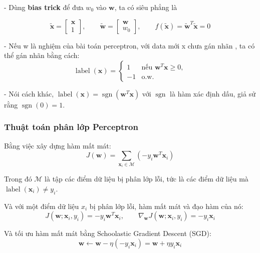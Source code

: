 - Dùng \textbf{bias trick} để đưa \(w_0\) vào \(\mathbf{w}\), ta có siêu phẳng là

\[
\tilde{\mathbf{x}} = \begin{bmatrix} \mathbf{x} \\ 1 \end{bmatrix}, \qquad
\tilde{\mathbf{w}} = \begin{bmatrix} \mathbf{w} \\ w_0 \end{bmatrix}, \qquad
f(\tilde{\mathbf{x}}) = \tilde{\mathbf{w}}^{T}\tilde{\mathbf{x}} = 0
\]

- Nếu w là nghiệm của bài toán perceptron, với data mới x chưa gán nhãn
, ta có thể gán nhãn bằng cách:
\begin{equation}
\label{eq:predict}
\operatorname{label}(\mathbf{x}) =
\begin{cases}
1 & \text{nếu } \mathbf{w}^{T}\mathbf{x} \ge 0,\\
-1 & \text{o.w.}
\end{cases}
\end{equation}

- Nói cách khác, $\operatorname{label}(\mathbf{x}) =
\operatorname{sgn}(\mathbf{w}^{T}\mathbf{x})$ với $\operatorname{sgn}$ là hàm xác định dấu,
giả sử rằng $\operatorname{sgn}(0)=1$.

\subsubsection{Thuật toán phân lớp Perceptron}
Bằng việc xây dựng hàm mất mát:
\[
J(\mathbf{w}) = \sum_{\mathbf{x}_i \in \mathcal{M}}
\left(-y_i \mathbf{w}^{T}\mathbf{x}_i\right)
\]

Trong đó \(\mathcal{M}\) là tập các điểm dữ liệu bị phân lớp lỗi, tức là các điểm dữ liệu mà \(\operatorname{label}(\mathbf{x}_i) \neq y_i\).

Và với một điểm dữ liệu \(x_i\) bị phân lớp lỗi, hàm mất mát và đạo hàm của nó:
\[
J(\mathbf{w}; \mathbf{x}_i, y_i)
= -y_i\mathbf{w}^{T}\mathbf{x}_i,
\qquad
\nabla_{\mathbf{w}}J(\mathbf{w}; \mathbf{x}_i, y_i)
= -y_i\mathbf{x}_i
\]

Và tối ưu hàm mất mát bằng Schoolastic Gradient Descent (SGD):
\begin{equation}
\label{eq:update}
\mathbf{w} \leftarrow \mathbf{w}
-\eta\left(-y_i\mathbf{x}_i\right)
= \mathbf{w}+\eta y_i\mathbf{x}_i
\end{equation}
